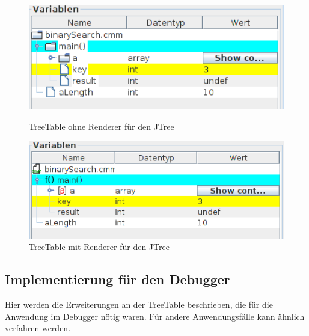 \begin{figure}[h!]
\centering
	\begin{minipage}{0.45\textwidth}
		\centering
		\includegraphics[width=1.0\textwidth]{./media/images/gui/var/tt-norender.png}
		\caption{TreeTable ohne Renderer für den JTree}\label{fig:deb-tt-render-no}
	\end{minipage}\hfill
	\begin{minipage}{0.48\textwidth}
		\centering
		\includegraphics[width=1.0\textwidth]{./media/images/gui/var/tt-render.png}
		\caption{TreeTable mit Renderer für den JTree}\label{fig:deb-tt-render-no}
	\end{minipage}
\end{figure}

\subsection{Implementierung für den Debugger}
Hier werden die Erweiterungen an der TreeTable beschrieben, die für die Anwendung im Debugger nötig waren. Für andere Anwendungsfälle kann ähnlich verfahren werden.

